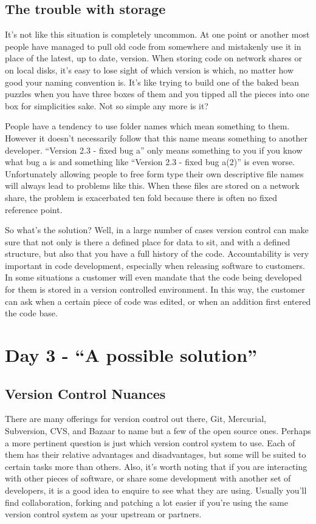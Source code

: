 \subsection{The trouble with storage}

It's not like this situation is completely uncommon.
At one point or another most people have managed to pull old code from somewhere and mistakenly use it in place of the latest, up to date, version.
When storing code on network shares or on local disks, it's easy to lose sight of which version is which, no matter how good your naming convention is.
It's like trying to build one of the baked bean puzzles when you have three boxes of them and you tipped all the pieces into one box for simplicities sake.
Not so simple any more is it?

People have a tendency to use folder names which mean something to them.
However it doesn't necessarily follow that this name means something to another developer.
``Version 2.3 - fixed bug a'' only means something to you if you know what bug a is and something like ``Version 2.3 - fixed bug a(2)'' is even worse.
Unfortunately allowing people to free form type their own descriptive file names will always lead to problems like this.
When these files are stored on a network share, the problem is exacerbated ten fold because there is often no fixed reference point.

So what's the solution? Well, in a large number of cases version control can make sure that not only is there a defined place for data to sit, and with a defined structure, but also that you have a full history of the code.
Accountability is very important in code development, especially when releasing software to customers.
In some situations a customer will even mandate that the code being developed for them is stored in a version controlled environment.
In this way, the customer can ask when a certain piece of code was edited, or when an addition first entered the code base.

\section{Day 3 - ``A possible solution''}
\subsection{Version Control Nuances}

There are many offerings for version control out there, Git, Mercurial, Subversion, CVS, and Bazaar to name but a few of the open source ones.
Perhaps a more pertinent question is just which version control system to use.
Each of them has their relative advantages and disadvantages, but some will be suited to certain tasks more than others.
Also, it's worth noting that if you are interacting with other pieces of software, or share some development with another set of developers, it is a good idea to enquire to see what they are using.
Usually you'll find collaboration, forking and patching a lot easier if you're using the same version control system as your upstream or partners.

